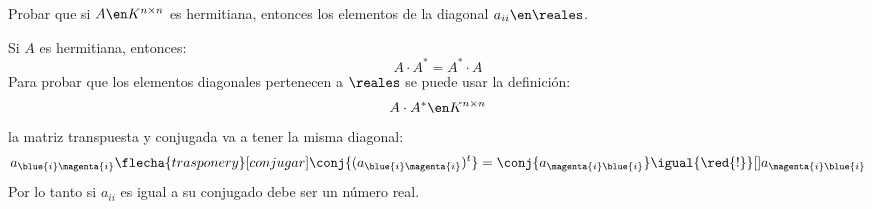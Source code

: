 \begin{enunciado}{\ejercicio}
  Probar que si $A \en K^{n \times n}$ es hermitiana, entonces los elementos de la diagonal $a_{ii} \en \reales$.
\end{enunciado}

Si $A$ es hermitiana, entonces:
$$
  A \cdot A^* = A^* \cdot A
$$
Para probar que los elementos diagonales pertenecen a $\reales$ se puede usar la definición:
$$
  A \cdot A^* \en K^{n \times n}
$$
la matriz transpuesta y conjugada va a tener la misma diagonal:
$$
  a_{\blue{i}\magenta{i}}
  \flecha{trasponer y}[conjugar]
  \conj{(a_{\blue{i}\magenta{i}})^t} =
  \conj{a_{\magenta{i}\blue{i}}}
  \igual{\red{!}}[]
  a_{\magenta{i}\blue{i}}
$$
Por lo tanto si $a_{ii}$ es igual a su conjugado debe ser un número real.

\begin{aportes}
  \item {}
\end{aportes}
